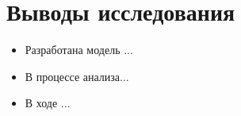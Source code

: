 \chapter{Выводы исследования}

\begin{itemize}
\item Разработана модель ...
\item В процессе анализа...
\item В ходе ...
\end{itemize}
